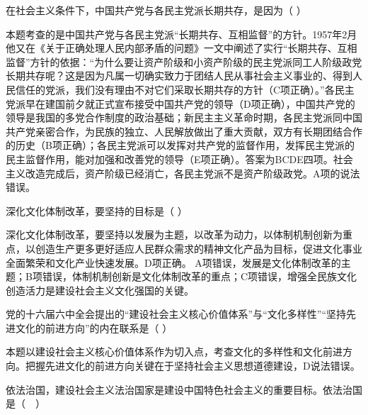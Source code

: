 \question 在社会主义条件下，中国共产党与各民主党派长期共存，是因为（ ）
\par{}
\begin{solution}本题考查的是中国共产党与各民主党派``长期共存、互相监督''的方针。1957年2月他又在《关于正确处理人民内部矛盾的问题》一文中阐述了实行``长期共存、互相监督''方针的依据：``为什么要让资产阶级和小资产阶级的民主党派同工人阶级政党长期共存呢？这是因为凡属一切确实致力于团结人民从事社会主义事业的、得到人民信任的党派，我们没有理由不对它们采取长期共存的方针（C项正确）。''各民主党派早在建国前夕就正式宣布接受中国共产党的领导（D项正确），中国共产党的领导是我国的多党合作制度的政治基础；新民主主义革命时期，各民主党派同中国共产党亲密合作，为民族的独立、人民解放做出了重大贡献，双方有长期团结合作的历史（B项正确）；各民主党派可以发挥对共产党的监督作用，发挥民主党派的民主监督作用，能对加强和改善党的领导（E项正确）。答案为BCDE四项。社会主义改造完成后，资产阶级已经消亡，各民主党派不是资产阶级政党。A项的说法错误。
\end{solution}
\question 深化文化体制改革，要坚持的目标是（ ）
\par{}
\begin{solution}深化文化体制改革，要坚持以发展为主题，以改革为动力，以体制机制创新为重点，以创造生产更多更好适应人民群众需求的精神文化产品为目标，促进文化事业全面繁荣和文化产业快速发展。D项正确。
A项错误，发展是文化体制改革的主题；B项错误，体制机制创新是文化体制改革的重点；C项错误，增强全民族文化创造活力是建设社会主义文化强国的关键。
\end{solution}
\question 党的十六届六中全会提出的``建设社会主义核心价值体系''与``文化多样性''``坚持先进文化的前进方向''的内在联系是（
）
\par{}
\begin{solution}本题以建设社会主义核心价值体系作为切入点，考查文化的多样性和文化前进方向。把握先进文化的前进方向关键在于坚持社会主义思想道德建设，D说法错误。
\end{solution}
\question 依法治国，建设社会主义法治国家是建设中国特色社会主义的重要目标。依法治国是（　）
